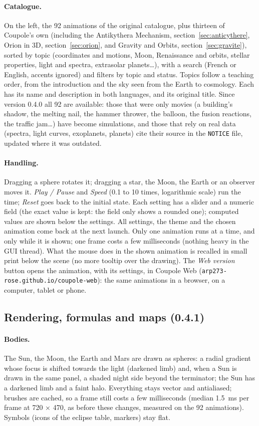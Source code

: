 \paragraph{Catalogue.} On the left, the 92 animations of the original catalogue, plus thirteen of Coupole's own (including the Antikythera Mechanism, section~\ref{sec:anticythere}, Orion in 3D, section~\ref{sec:orion}, and Gravity and Orbits, section~\ref{sec:gravite}), sorted by topic (coordinates and
motions, Moon, Renaissance and orbits, stellar properties, light and spectra, extrasolar planets…), with a search
(French or English, accents ignored) and filters by topic and status. Topics follow a teaching order, from the
introduction and the sky seen from the Earth to cosmology. Each has its name and description in both
languages, and its original title. Since version 0.4.0 all 92 are available: those that were only movies (a building's shadow, the melting nail, the hammer thrower, the balloon, the fusion reactions, the traffic jam…) have become simulations, and those that rely on real data (spectra, light curves, exoplanets, planets) cite their source in the \texttt{NOTICE} file, updated where it was outdated.

\paragraph{Handling.} Dragging a sphere rotates it; dragging a star, the Moon, the Earth or an observer moves it.
\emph{Play / Pause} and \emph{Speed} (0.1 to 10 times, logarithmic scale) run the time; \emph{Reset} goes back to the
initial state. Each setting has a slider and a numeric field (the exact value is kept: the field only shows a rounded
one); computed values are shown below the settings. All settings, the theme and the chosen animation come back at the
next launch. Only one animation runs at a time, and only while it is shown; one frame costs a few milliseconds
(nothing heavy in the GUI thread). What the mouse does in the shown animation is recalled in small print below the
scene (no more tooltip over the drawing). The \emph{Web version} button opens the animation, with its settings, in
Coupole Web (\texttt{arp273-rose.github.io/coupole-web}): the same animations in a browser, on a computer, tablet or
phone.

\subsection{Rendering, formulas and maps (0.4.1)}
\paragraph{Bodies.} The Sun, the Moon, the Earth and Mars are drawn as spheres: a radial gradient whose focus is
shifted towards the light (darkened limb) and, when a Sun is drawn in the same panel, a shaded night side beyond the
terminator; the Sun has a darkened limb and a faint halo. Everything stays vector and antialiased; brushes are cached,
so a frame still costs a few milliseconds (median 1.5~ms per frame at 720 × 470, as before these changes, measured on the 92 animations). Symbols (icons
of the eclipse table, markers) stay flat.

